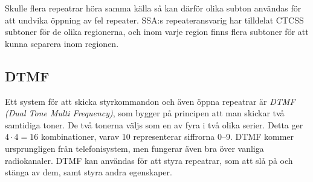 Skulle flera repeatrar höra samma källa så kan därför olika subton användas
för att undvika öppning av fel repeater.
SSA:s repeateransvarig har tilldelat CTCSS subtoner för de olika regionerna,
och inom varje region finns flera subtoner för att kunna separera inom
regionen.

\subsection{DTMF}

Ett system för att skicka styrkommandon och även öppna repeatrar är
\emph{DTMF (Dual Tone Multi Frequency)}, som bygger på principen att man
skickar två samtidiga toner.
De två tonerna väljs som en av fyra i två olika serier.
Detta ger \(4 \cdot 4 = 16\) kombinationer, varav 10 representerar siffrorna 0--9.
DTMF kommer ursprungligen från telefonisystem, men fungerar även bra över
vanliga radiokanaler.
DTMF kan användas för att styra repeatrar, som att slå på och stänga av dem,
samt styra andra egenskaper.
